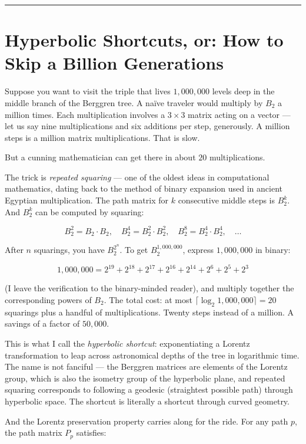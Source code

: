 \documentclass[12pt, letterpaper, openany]{book}
\theoremstyle{definition}
\theoremstyle{remark}
\begin{document}
\bigskip\noindent\rule{\textwidth}{0.4pt}\bigskip



\section*{Hyperbolic Shortcuts, or: How to Skip a Billion Generations}


Suppose you want to visit the triple that lives $1{,}000{,}000$ levels deep in the middle branch of the Berggren tree. A naïve traveler would multiply by $B_2$ a million times. Each multiplication involves a $3 \times 3$ matrix acting on a vector --- let us say nine multiplications and six additions per step, generously. A million steps is a million matrix multiplications. That is slow.

But a cunning mathematician can get there in about $20$ multiplications.

The trick is \textit{repeated squaring} --- one of the oldest ideas in computational mathematics, dating back to the method of binary expansion used in ancient Egyptian multiplication. The path matrix for $k$ consecutive middle steps is $B_2^k$. And $B_2^k$ can be computed by squaring:

\[
B_2^2 = B_2 \cdot B_2, \quad B_2^4 = B_2^2 \cdot B_2^2, \quad B_2^8 = B_2^4 \cdot B_2^4, \quad \ldots
\]

After $n$ squarings, you have $B_2^{2^n}$. To get $B_2^{1{,}000{,}000}$, express $1{,}000{,}000$ in binary:

\[
1{,}000{,}000 = 2^{19} + 2^{18} + 2^{17} + 2^{16} + 2^{14} + 2^{6} + 2^5 + 2^3
\]

(I leave the verification to the binary-minded reader), and multiply together the corresponding powers of $B_2$. The total cost: at most $\lceil \log_2 1{,}000{,}000 \rceil = 20$ squarings plus a handful of multiplications. Twenty steps instead of a million. A savings of a factor of $50{,}000$.

This is what I call the \textit{hyperbolic shortcut}: exponentiating a Lorentz transformation to leap across astronomical depths of the tree in logarithmic time. The name is not fanciful --- the Berggren matrices are elements of the Lorentz group, which is also the isometry group of the hyperbolic plane, and repeated squaring corresponds to following a geodesic (straightest possible path) through hyperbolic space. The shortcut is literally a shortcut through curved geometry.

And the Lorentz preservation property carries along for the ride. For any path $p$, the path matrix $P_p$ satisfies:
\end{document}
